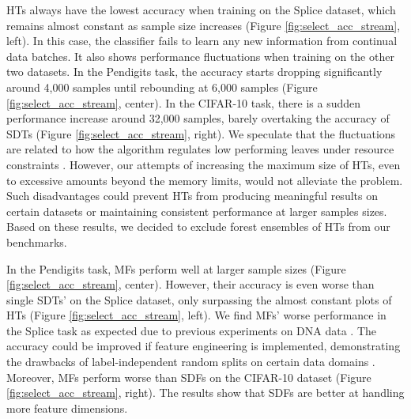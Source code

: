 HTs always have the lowest accuracy when training on the Splice dataset, which remains almost constant as sample size increases (Figure \ref{fig:select_acc_stream}, left). In this case, the classifier fails to learn any new information from continual data batches.
It also shows performance fluctuations when training on the other two datasets. In the Pendigits task, the accuracy starts dropping significantly around 4,000 samples until rebounding at 6,000 samples (Figure \ref{fig:select_acc_stream}, center). In the CIFAR-10 task, there is a sudden performance increase around 32,000 samples, barely overtaking the accuracy of SDTs (Figure \ref{fig:select_acc_stream}, right).
We speculate that the fluctuations are related to how the algorithm regulates low performing leaves under resource constraints \citep{domingos_mining_2000}. However, our attempts of increasing the maximum size of HTs, even to excessive amounts beyond the memory limits, would not alleviate the problem. 
Such disadvantages could prevent HTs from producing meaningful results on certain datasets or maintaining consistent performance at larger samples sizes. Based on these results, we decided to exclude forest ensembles of HTs from our benchmarks.

In the Pendigits task, MFs perform well at larger sample sizes (Figure \ref{fig:select_acc_stream}, center). However, their accuracy is even worse than single SDTs' on the Splice dataset, only surpassing the almost constant plots of HTs (Figure \ref{fig:select_acc_stream}, left). 
We find MFs' worse performance in the Splice task as expected due to previous experiments on DNA data \citep{lakshminarayanan_mondrian_2014}. 
The accuracy could be improved if feature engineering is implemented, demonstrating the drawbacks of label-independent random splits on certain data domains \citep{roy_mondrian_2009, ziegler_mining_2014}.
Moreover, MFs perform worse than SDFs on the CIFAR-10 dataset (Figure \ref{fig:select_acc_stream}, right). The results show that SDFs are better at handling more feature dimensions.

